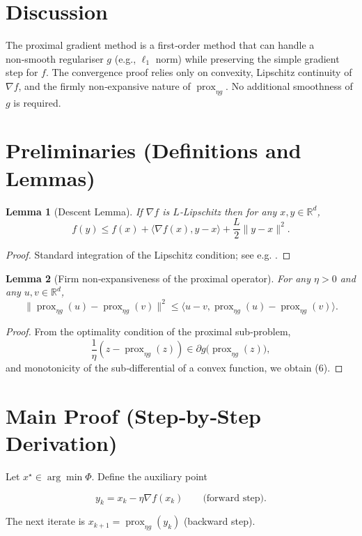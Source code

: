 \documentclass{article}
\newtheorem{lemma}{Lemma}
\newcommand{\prox}{\operatorname{prox}}
\newcommand{\R}{\mathbb{R}}
\begin{document}
\section*{Discussion}
The proximal gradient method is a first‑order method that can handle a non‑smooth regulariser $g$ (e.g., $\ell_{1}$ norm) while preserving the simple gradient step for $f$. The convergence proof relies only on convexity, Lipschitz continuity of $\nabla f$, and the firmly non‑expansive nature of $\prox_{\eta g}$. No additional smoothness of $g$ is required.

\newpage
\section*{Preliminaries (Definitions and Lemmas)}
\begin{lemma}[Descent Lemma]\label{lem:descent}
If $\nabla f$ is $L$‑Lipschitz then for any $x,y\in\R^{d}$,
\[
f(y)\le f(x)+\langle\nabla f(x),y-x\rangle+\frac{L}{2}\|y-x\|^{2}.
\tag{5}
\]
\end{lemma}
\begin{proof}
Standard integration of the Lipschitz condition; see e.g. \cite{Nesterov2004}.
\end{proof}

\begin{lemma}[Firm non‑expansiveness of the proximal operator]\label{lem:firm}
For any $\eta>0$ and any $u,v\in\R^{d}$,
\[
\|\prox_{\eta g}(u)-\prox_{\eta g}(v)\|^{2}
\le \langle u-v,\prox_{\eta g}(u)-\prox_{\eta g}(v)\rangle .
\tag{6}
\]
\end{lemma}
\begin{proof}
From the optimality condition of the proximal sub‑problem,
\[
\frac{1}{\eta}(z-\prox_{\eta g}(z))\in\partial g\bigl(\prox_{\eta g}(z)\bigr),
\]
and monotonicity of the sub‑differential of a convex function, we obtain (6).
\end{proof}

\section*{Main Proof (Step‑by‑Step Derivation)}
Let $x^{\star}\in\arg\min\Phi$.  Define the auxiliary point  

\[
y_{k}=x_{k}-\eta\nabla f(x_{k})\qquad\text{(forward step).}
\tag{7}
\]

The next iterate is $x_{k+1}= \prox_{\eta g}(y_{k})$ (backward step).  
\end{document}
